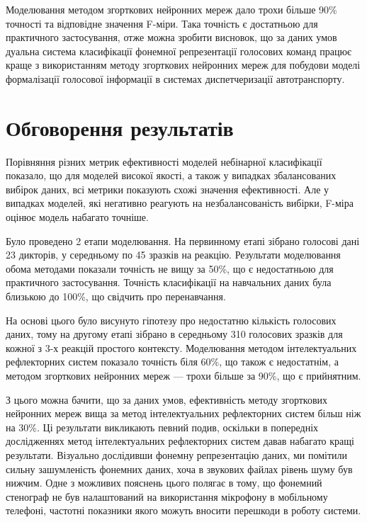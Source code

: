 Моделювання методом згорткових нейронних мереж дало трохи більше 90\% точності та відповідне значення F-міри. Така точність є достатньою для практичного застосування, отже можна зробити висновок, що за даних умов дуальна система класифікації фонемної репрезентації голосових команд працює краще з використанням методу згорткових нейронних мереж для побудови моделі формалізації голосової інформації в системах диспетчеризації автотранспорту.

\section{Обговорення результатів}

Порівняння різних метрик ефективності моделей небінарної класифікації показало, що для моделей високої якості, а також у випадках збалансованих вибірок даних, всі метрики показують схожі значення ефективності. Але у випадках моделей, які негативно реагують на незбалансованість вибірки, F-міра оцінює модель набагато точніше.

Було проведено 2 етапи моделювання. На первинному етапі зібрано голосові дані 23 дикторів, у середньому по 45 зразків на реакцію. Результати моделювання обома методами показали точність не вищу за 50\%, що є недостатньою для практичного застосування. Точність класифікації на навчальних даних була близькою до 100\%, що свідчить про перенавчання.

На основі цього було висунуто гіпотезу про недостатню кількість голосових даних, тому на другому етапі зібрано в середньому 310 голосових зразків для кожної з 3-х реакцій простого контексту.  Моделювання методом інтелектуальних рефлекторних систем показало точність біля 60\%, що також є недостатнім, а методом згорткових нейронних мереж — трохи більше за 90\%, що є прийнятним.

З цього можна бачити, що за даних умов, ефективність методу згорткових нейронних мереж вища за метод інтелектуальних рефлекторних систем більш ніж на 30\%. Ці результати викликають певний подив, оскільки в попередніх дослідженнях \cite{Egorchenkov_2016,Teslia_2014,Teslia_2013} метод інтелектуальних рефлекторних систем давав набагато кращі результати. Візуально дослідивши фонемну репрезентацію даних, ми помітили сильну зашумленість фонемних даних, хоча в звукових файлах рівень шуму був нижчим. Одне з можливих пояснень цього полягає в тому, що фонемний стенограф не був налаштований на використання мікрофону в мобільному телефоні, частотні показники якого можуть вносити перешкоди в роботу системи.  

